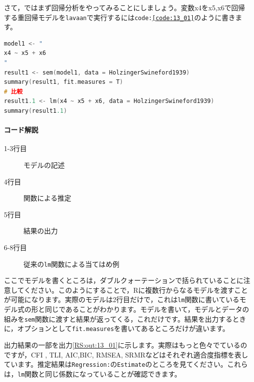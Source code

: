 \documentclass{ltjsbook}
\begin{document}
さて，ではまず回帰分析をやってみることにしましょう。変数x4をx5,x6で回帰する重回帰モデルを\texttt{lavaan}で実行するには\texttt{code:\ref{code:13_01}}のように書きます。

\begin{lstlisting}[language=c++,label={code:13_01},caption={重回帰モデル}]
model1 <- "
x4 ~ x5 + x6
"
result1 <- sem(model1, data = HolzingerSwineford1939)
summary(result1, fit.measures = T)
# 比較
result1.1 <- lm(x4 ~ x5 + x6, data = HolzingerSwineford1939)
summary(result1.1)
\end{lstlisting}

\paragraph{コード解説}
\begin{description}
	\item[1-3行目] モデルの記述
	\item[4行目] 関数による推定
	\item[5行目] 結果の出力
	\item[6-8行目] 従来の\texttt{lm}関数による当てはめ例
\end{description}

ここでモデルを書くところは，ダブルクォーテーションで括られていることに注意してください。このようにすることで，Rに複数行からなるモデルを渡すことが可能になります。実際のモデルは2行目だけで，これは\texttt{lm}関数に書いているモデル式の形と同じであることがわかります。モデルを書いて，モデルとデータの組みを\texttt{sem}関数に渡すと結果が返ってくる，これだけです。結果を出力するときに，オプションとして\texttt{fit.measures}を書いてあるところだけが違います。

出力結果の一部を出力\ref{RS:out:13_01}に示します。実際はもっと色々でているのですが，CFI , TLI, AIC,BIC, RMSEA, SRMRなどはそれぞれ適合度指標を表しています。推定結果は\texttt{Regression:}の\texttt{Estimate}のところを見てください。これらは，\texttt{lm}関数と同じ係数になっていることが確認できます。
\end{document}
